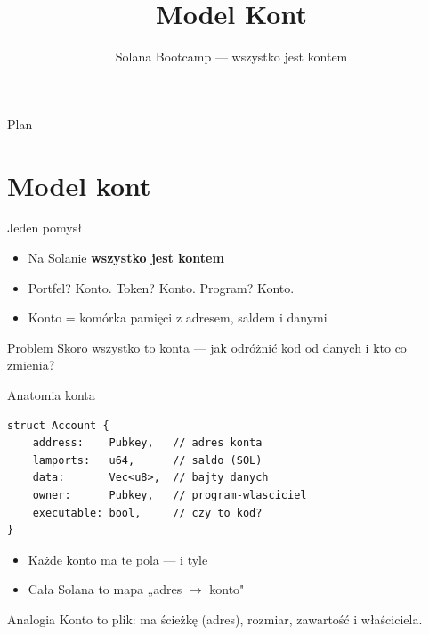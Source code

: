 

\usepackage[utf8]{inputenc}
\usepackage[T1]{fontenc}

\title{Model Kont}
\subtitle{Solana Bootcamp --- wszystko jest kontem}
\author{}



\maketitleframe

\begin{frame}{Plan}
  \tableofcontents
\end{frame}

\section{Model kont}

\begin{frame}{Jeden pomysł}
  \begin{itemize}
    \item Na Solanie \textbf{wszystko jest kontem}
    \item Portfel? Konto. Token? Konto. Program? Konto.
    \item Konto = komórka pamięci z adresem, saldem i danymi
  \end{itemize}
  \vspace{0.25cm}
  \begin{alertblock}{Problem}
    Skoro wszystko to konta --- jak odróżnić kod od danych i kto co zmienia?
  \end{alertblock}
\end{frame}

\begin{frame}[fragile]{Anatomia konta}
\begin{lstlisting}
struct Account {
    address:    Pubkey,   // adres konta
    lamports:   u64,      // saldo (SOL)
    data:       Vec<u8>,  // bajty danych
    owner:      Pubkey,   // program-wlasciciel
    executable: bool,     // czy to kod?
}
\end{lstlisting}
  \begin{itemize}
    \item Każde konto ma te pola --- i tyle
    \item Cała Solana to mapa „adres $\to$ konto"
  \end{itemize}
  \begin{exampleblock}{Analogia}
    Konto to plik: ma ścieżkę (adres), rozmiar, zawartość i właściciela.
  \end{exampleblock}
\end{frame}

